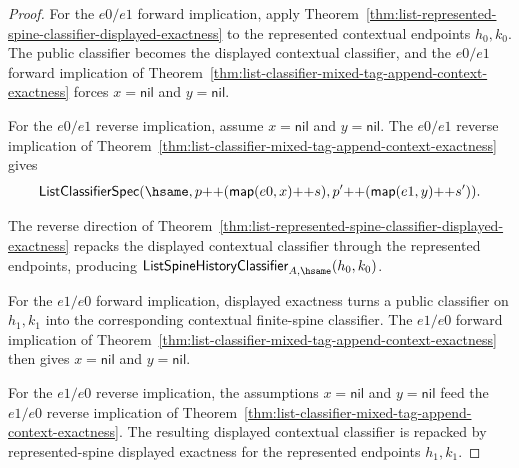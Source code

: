 \begin{proof}
For the $e0/e1$ forward implication, apply
Theorem~\ref{thm:list-represented-spine-classifier-displayed-exactness} to the
represented contextual endpoints $h_0,k_0$. The public classifier becomes the
displayed contextual classifier, and the $e0/e1$ forward implication of
Theorem~\ref{thm:list-classifier-mixed-tag-append-context-exactness} forces
$x=\mathsf{nil}$ and $y=\mathsf{nil}$.

For the $e0/e1$ reverse implication, assume
$x=\mathsf{nil}$ and $y=\mathsf{nil}$. The $e0/e1$ reverse implication of
Theorem~\ref{thm:list-classifier-mixed-tag-append-context-exactness} gives
$$
\mathsf{ListClassifierSpec}(\hsame,
  p{++}(\mathsf{map}(e0,x){++}s),
  p'{++}(\mathsf{map}(e1,y){++}s')).
$$

The reverse direction of
Theorem~\ref{thm:list-represented-spine-classifier-displayed-exactness} repacks
the displayed contextual classifier through the represented endpoints, producing
$\mathsf{ListSpineHistoryClassifier}_{A,\hsame}(h_0,k_0)$.

For the $e1/e0$ forward implication, displayed exactness turns a public
classifier on $h_1,k_1$ into the corresponding contextual finite-spine
classifier. The $e1/e0$ forward implication of
Theorem~\ref{thm:list-classifier-mixed-tag-append-context-exactness} then gives
$x=\mathsf{nil}$ and $y=\mathsf{nil}$.

For the $e1/e0$ reverse implication, the assumptions $x=\mathsf{nil}$ and
$y=\mathsf{nil}$ feed the $e1/e0$ reverse implication of
Theorem~\ref{thm:list-classifier-mixed-tag-append-context-exactness}. The
resulting displayed contextual classifier is repacked by represented-spine
displayed exactness for the represented endpoints $h_1,k_1$.
\end{proof}

